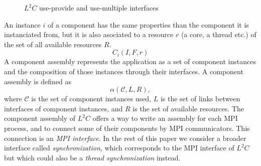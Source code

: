 \begin{figure}[h!]
\begin{center}
  \hspace{2cm}
  \hspace{2cm}
  \caption{$L^2C$ use-provide and use-multiple interfaces}
  \label{interfaces}
\end{center}
\end{figure}

An instance $i$ of a component has the same properties than the component it is instanciated from, but it is also asociated to a resource $r$ (a core, a thread etc.) of the set of all available resources $R$.
\begin{equation}
C_i(I,F,r)
\end{equation}
A component assembly represents the application as a set of component instances and the composition of those instances through their interfaces. A component assembly is defined as
\begin{equation}
\alpha (\mathcal{C},L,R),
\end{equation}
where $\mathcal{C}$ is the set of component instances used, $L$ is the set of links between interfaces of component instances, and $R$ is the set of available resources. The component assembly of $L^2C$ offers a way to write an assembly for each MPI process, and to connect some of their components by MPI communicators. This connection is an \textit{MPI interface}. In the rest of this paper we consider a broader interface called \textit{synchronization}, which corresponds to the MPI interface of $L^2C$ but which could also be a \textit{thread synchronization} instead.


